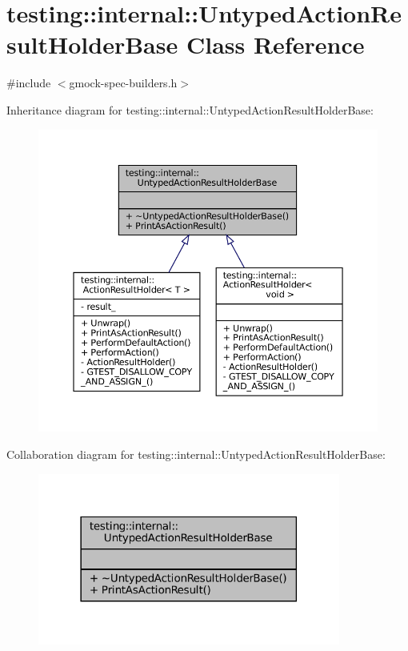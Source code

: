 \hypertarget{classtesting_1_1internal_1_1UntypedActionResultHolderBase}{}\section{testing\+:\+:internal\+:\+:Untyped\+Action\+Result\+Holder\+Base Class Reference}
\label{classtesting_1_1internal_1_1UntypedActionResultHolderBase}


{\ttfamily \#include $<$gmock-\/spec-\/builders.\+h$>$}



Inheritance diagram for testing\+:\+:internal\+:\+:Untyped\+Action\+Result\+Holder\+Base\+:
\nopagebreak
\begin{figure}[H]
\begin{center}
\leavevmode
\includegraphics[width=350pt]{classtesting_1_1internal_1_1UntypedActionResultHolderBase__inherit__graph}
\end{center}
\end{figure}


Collaboration diagram for testing\+:\+:internal\+:\+:Untyped\+Action\+Result\+Holder\+Base\+:
\nopagebreak
\begin{figure}[H]
\begin{center}
\leavevmode
\includegraphics[width=282pt]{classtesting_1_1internal_1_1UntypedActionResultHolderBase__coll__graph}
\end{center}
\end{figure}

